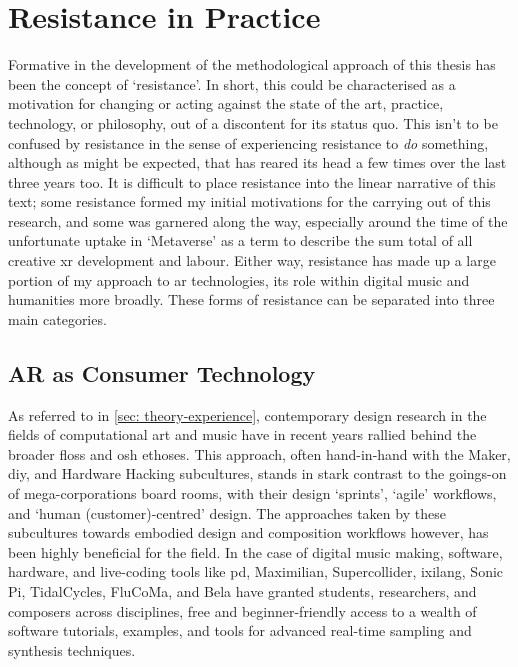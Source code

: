 \section{Resistance in Practice}\label{sec: method-resistance}
Formative in the development of the methodological approach of this thesis has been the concept of `resistance'. In short, this could be characterised as a motivation for changing or acting against the state of the art, practice, technology, or philosophy, out of a discontent for its status quo. This isn't to be confused by resistance in the sense of experiencing resistance to \textit{do} something, although as might be expected, that has reared its head a few times over the last three years too. It is difficult to place resistance into the linear narrative of this text; some resistance formed my initial motivations for the carrying out of this research, and some was garnered along the way, especially around the time of the unfortunate uptake in `Metaverse' as a term to describe the sum total of all creative \gls{xr} development and labour. Either way, resistance has made up a large portion of my approach to \gls{ar} technologies, its role within digital music and humanities more broadly. These forms of resistance can be separated into three main categories.

\subsection{AR as Consumer Technology}\label{sec: method-resistance-maker}
As referred to in \autoref{sec: theory-experience}, contemporary design research in the fields of computational art and music have in recent years rallied behind the broader \gls{floss} and \gls{osh} ethoses. This approach, often hand-in-hand with the Maker, \gls{diy}, and Hardware Hacking subcultures, stands in stark contrast to the goings-on of mega-corporations board rooms, with their design `sprints', `agile' workflows, and `human (customer)-centred' design. The approaches taken by these subcultures towards embodied design and composition workflows however, has been highly beneficial for the field. In the case of digital music making, software, hardware, and live-coding tools like \gls{pd}, Maximilian, Supercollider, ixilang, Sonic Pi, TidalCycles, FluCoMa, and Bela have granted students, researchers, and composers across disciplines, free and beginner-friendly access to a wealth of software tutorials, examples, and tools for advanced real-time sampling and synthesis techniques.

